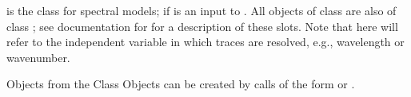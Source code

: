 \begin{Description}\relax
{} is the class for spectral models; if  
is an 
input to . All objects of class 
 are
also of class ; see documentation for  
for a description of 
these slots.  Note that here  
will refer to the independent variable in
which traces are resolved, e.g., wavelength or wavenumber.
\end{Description}
\begin{Section}{Objects from the Class}
Objects can be created by calls of the form  or 
.
\end{Section}

